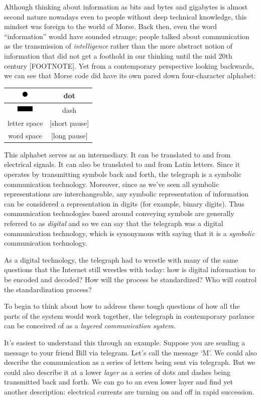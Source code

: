 \documentclass[UTF8]{book}
\newcommand*\thickdash{\includegraphics{thick-dash2}}
\newcommand*\thickdot{\includegraphics{thick-dot2}}
\begin{document}
\begin{CJK}{UTF8}{gbsn}
Although thinking about information as bits and bytes and gigabytes is almost second nature nowadays even to people without deep technical knowledge, this mindset was foreign to the world of Morse. Back then, even the word ``information'' would have sounded strange; people talked about communication as the transmission of \emph{intelligence} rather than the more abstract notion of information that did not get a foothold in our thinking until the mid 20th century [FOOTNOTE]. Yet from a contemporary perspective looking backwards, we can see that Morse code did have its own pared down four-character alphabet:

\begin{center}
\begin{tabular}{cc}
\thickdot & dot \\
\hline
\thickdash & dash \\
\hline
letter space & [short pause]  \\
\hline
word space & [long pause]  \\
\end{tabular}
\end{center}

This alphabet serves as an intermediary. It can be translated to and from electrical signals. It can also be translated to and from Latin letters. Since it operates by transmitting symbols back and forth, the telegraph is a symbolic communication technology. Moreover, since as we've seen all symbolic representations are interchangeable, any symbolic representation of information can be considered a representation in digits (for example, binary digits). Thus communication technologies based around conveying symbols are generally referred to as \emph{digital} and so we can say that the telegraph was a digital communication technology, which is synonymous with saying that it is a \emph{symbolic} communication technology.

As a digital technology, the telegraph had to wrestle with many of the same questions that the Internet still wrestles with today: how is digital information to be encoded and decoded? How will the process be standardized? Who will control the standardization process?

To begin to think about how to address these tough questions of how all the parts of the system would work together, the telegraph in contemporary parlance can be conceived of as a \emph{layered communication system}.

It's easiest to understand this through an example. Suppose you are sending a message to your friend Bill via telegram. Let's call the message `M'. We could also describe the communication as a series of letters being sent via telegraph. But we could also describe it at a lower \emph{layer} as a series of dots and dashes being transmitted back and forth. We can go to an even lower layer and find yet another description: electrical currents are turning on and off in rapid succession.


\end{CJK}
\end{document}
